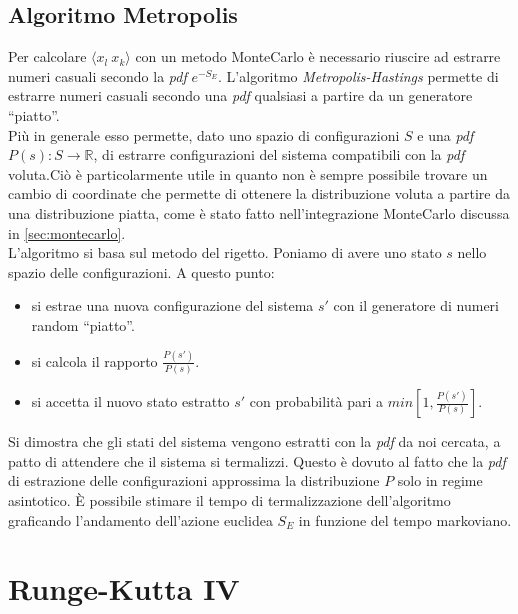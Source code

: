 \section*{Algoritmo Metropolis}
Per calcolare $\langle x_l \ x_k \rangle $ con un metodo MonteCarlo è necessario riuscire ad estrarre numeri casuali secondo la \emph{pdf} $ e^{-S_E}$.
L'algoritmo \emph{Metropolis-Hastings} permette di estrarre numeri casuali secondo una \emph{pdf} qualsiasi a partire da un generatore ``piatto''.\\
Più in generale esso permette, dato uno spazio di configurazioni $S$ e una \emph{pdf} $ P(s) : S \rightarrow \mathbb{R}$, di estrarre
configurazioni del sistema compatibili con la \emph{pdf} voluta.Ciò è particolarmente utile in quanto non è sempre possibile trovare un cambio
di coordinate che permette di ottenere la distribuzione voluta a partire da una distribuzione piatta,
come è stato fatto nell'integrazione MonteCarlo discussa in \ref{sec:montecarlo}.\\
L'algoritmo si basa sul metodo del rigetto. Poniamo di avere uno stato $s$ nello spazio delle configurazioni. A questo punto:
\begin{itemize}
\item si estrae una nuova configurazione del sistema $s'$ con il generatore di numeri random ``piatto''.
\item si calcola il rapporto $ \frac{P(s')}{P(s)}$.
\item si accetta il nuovo stato estratto $s'$ con probabilità pari a $ min\left[ 1,\frac{P(s')}{P(s)} \right]$.
\end{itemize}
Si dimostra che gli stati del sistema vengono estratti con la \emph{pdf} da noi cercata,
a patto di attendere che il sistema si termalizzi. Questo è dovuto al fatto che la \emph{pdf} di estrazione delle configurazioni approssima la distribuzione $P$ solo in regime asintotico.
È possibile stimare il tempo di termalizzazione dell'algoritmo graficando l'andamento dell'azione euclidea $S_E$ in funzione del tempo markoviano.\\

\chapter{Runge-Kutta IV}

